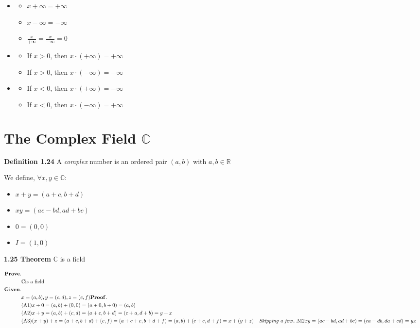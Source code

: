 \documentclass{article}
\newcommand{\DEFINITION}[1]{
  \label{def-#1}
  {\noindent \bf Definition #1}
}
\newcommand{\THEOREM}[1]{
  \label{theorem-#1}
  {\noindent \bf #1 Theorem}
}
\begin{document}
  \begin{itemize}
    \item
      \begin{itemize}
        \item $ x + \infty = +\infty $
        \item $ x - \infty = -\infty $
        \item $ \frac{x}{+\infty} = \frac{x}{-\infty} = 0 $
      \end{itemize}
    \item
      \begin{itemize}
        \item If $x > 0$, then $x \cdot (+\infty) = +\infty$
        \item If $x > 0$, then $x \cdot (-\infty) = -\infty$
      \end{itemize}
    \item
      \begin{itemize}
        \item If $x < 0$, then $x \cdot (+\infty) = -\infty$
        \item If $x < 0$, then $x \cdot (-\infty) = +\infty$
      \end{itemize}
  \end{itemize}

  \section{The Complex Field $\mathbb{C}$}

  \DEFINITION{1.24} A \emph{complex} number is an ordered pair $(a, b)$ with $a, b \in \mathbb{R}$ 

  We define, $ \forall x, y \in \mathbb{C} $:
  \begin{itemize}
    \item $ x + y = (a + c, b + d) $
    \item $ x y = (ac - bd, ad + bc) $
    \item $ 0 = (0, 0) $
    \item $ I = (1, 0) $
  \end{itemize}

  \THEOREM{1.25} $\mathbb{C}$ is a field

  \begin{align*}
    {\bf Prove.} \\
      & \mathbb{C} \text{is a field} \\
    {\bf Given.} \\
      & x = (a, b), y = (c, d), z = (e, f)
    {\bf Proof.} \\
      & \text{(A1)} x + 0 = (a, b) + (0, 0) = (a + 0, b + 0) = (a, b) \\
      & \text{(A2)} x + y = (a, b) + (c, d) = (a + c, b + d) = (c + a, d + b) = y + x \\
      & \text{(A3)} (x + y) + z = (a + c, b + d) + (e, f) = (a + c + e, b + d + f) = (a, b) + (c + e, d + f) = x + (y+z)
      & \text{\emph{Skipping a few...}}
      & \text{M2} xy = (ac - bd, ad + bc) = (ca - db, da + cd) = yx
  \end{align*}
\end{document}
